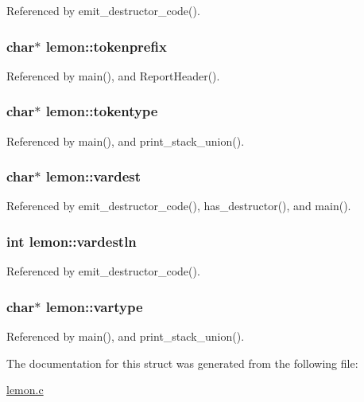 Referenced by emit\-\_\-destructor\-\_\-code().

\hypertarget{structlemon_a745b25b33fa6f9843f714959e57249cd}{
\subsubsection[{tokenprefix}]{\setlength{\rightskip}{0pt plus 5cm}char$\ast$ lemon\-::tokenprefix}}\label{structlemon_a745b25b33fa6f9843f714959e57249cd}


Referenced by main(), and Report\-Header().

\hypertarget{structlemon_a5a8197998a3b44a5aebfa1c3656284d7}{
\subsubsection[{tokentype}]{\setlength{\rightskip}{0pt plus 5cm}char$\ast$ lemon\-::tokentype}}\label{structlemon_a5a8197998a3b44a5aebfa1c3656284d7}


Referenced by main(), and print\-\_\-stack\-\_\-union().

\hypertarget{structlemon_a218d36617729ba9fda8ff23c6134808c}{
\subsubsection[{vardest}]{\setlength{\rightskip}{0pt plus 5cm}char$\ast$ lemon\-::vardest}}\label{structlemon_a218d36617729ba9fda8ff23c6134808c}


Referenced by emit\-\_\-destructor\-\_\-code(), has\-\_\-destructor(), and main().

\hypertarget{structlemon_aa924e36c604bf2f4478808693c3f06f0}{
\subsubsection[{vardestln}]{\setlength{\rightskip}{0pt plus 5cm}int lemon\-::vardestln}}\label{structlemon_aa924e36c604bf2f4478808693c3f06f0}


Referenced by emit\-\_\-destructor\-\_\-code().

\hypertarget{structlemon_aba6673e46aed4d62614c1042f70fde66}{
\subsubsection[{vartype}]{\setlength{\rightskip}{0pt plus 5cm}char$\ast$ lemon\-::vartype}}\label{structlemon_aba6673e46aed4d62614c1042f70fde66}


Referenced by main(), and print\-\_\-stack\-\_\-union().



The documentation for this struct was generated from the following file\-:\begin{DoxyCompactItemize}
\item 
\hyperlink{lemon_8c}{lemon.\-c}\end{DoxyCompactItemize}

